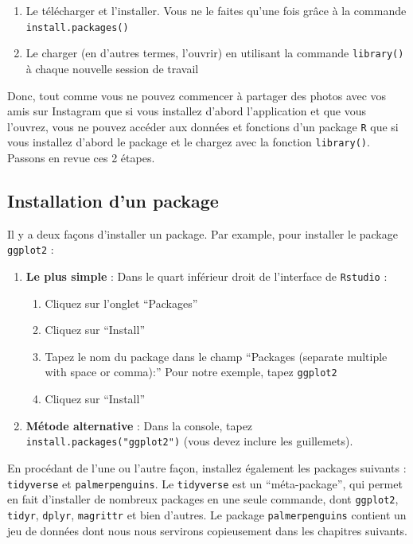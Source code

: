 \documentclass[
  a4paper,
  DIV=11,
  numbers=noendperiod,
  oneside]{scrreprt}
\providecommand{\tightlist}{%
  \setlength{\itemsep}{0pt}\setlength{\parskip}{0pt}}\usepackage{longtable,booktabs,array}
\begin{document}
\begin{enumerate}
\def\labelenumi{\arabic{enumi}.}
\tightlist
\item
  Le télécharger et l'installer. Vous ne le faites qu'une fois grâce à
  la commande \texttt{install.packages()}
\item
  Le charger (en d'autres termes, l'ouvrir) en utilisant la commande
  \texttt{library()} à chaque nouvelle session de travail
\end{enumerate}

Donc, tout comme vous ne pouvez commencer à partager des photos avec vos
amis sur Instagram que si vous installez d'abord l'application et que
vous l'ouvrez, vous ne pouvez accéder aux données et fonctions d'un
package \texttt{R} que si vous installez d'abord le package et le
chargez avec la fonction \texttt{library()}. Passons en revue ces 2
étapes.

\subsection{Installation d'un package}\label{installation-dun-package}

Il y a deux façons d'installer un package. Par example, pour installer
le package \texttt{ggplot2} :

\begin{enumerate}
\def\labelenumi{\arabic{enumi}.}
\tightlist
\item
  \textbf{Le plus simple} : Dans le quart inférieur droit de l'interface
  de \texttt{Rstudio} :

  \begin{enumerate}
  \def\labelenumii{\alph{enumii})}
  \tightlist
  \item
    Cliquez sur l'onglet ``Packages''
  \item
    Cliquez sur ``Install''
  \item
    Tapez le nom du package dans le champ ``Packages (separate multiple
    with space or comma):'' Pour notre exemple, tapez \texttt{ggplot2}
  \item
    Cliquez sur ``Install''
  \end{enumerate}
\item
  \textbf{Métode alternative} : Dans la console, tapez
  \texttt{install.packages("ggplot2")} (vous devez inclure les
  guillemets).
\end{enumerate}

En procédant de l'une ou l'autre façon, installez également les packages
suivants : \texttt{tidyverse} et \texttt{palmerpenguins}. Le
\texttt{tidyverse} est un ``méta-package'', qui permet en fait
d'installer de nombreux packages en une seule commande, dont
\texttt{ggplot2}, \texttt{tidyr}, \texttt{dplyr}, \texttt{magrittr} et
bien d'autres. Le package \texttt{palmerpenguins} contient un jeu de
données dont nous nous servirons copieusement dans les chapitres
suivants.
\end{document}
